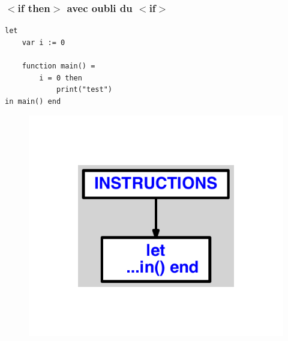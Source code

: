 \documentclass{article}
\begin{document}
\subsubsection{$ < $if then$ > $ avec oubli du $ < $if$ > $}
\begin{lstlisting}
let
	var i := 0

	function main() =
		i = 0 then
			print("test")
in main() end
\end{lstlisting}
\newpage
\begin{figure}[H]
\centering
\includegraphics[max width=\textwidth]{ast/ast_251.pdf}
\end{figure}
\newpage
\end{document}
